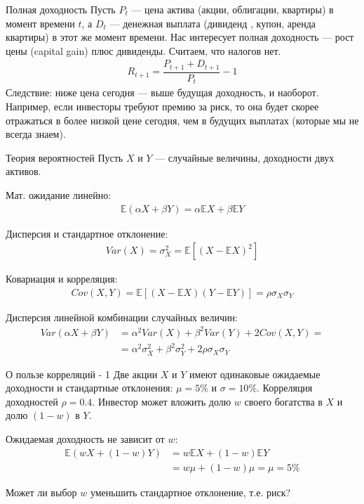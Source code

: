 \documentclass{beamer}
\begin{document}
\begin{frame}{Полная доходность}
\justify
Пусть $P_t$ --- цена актива (акции, облигации, квартиры) в момент времени $t$, а $D_t$ --- денежная выплата (дивиденд , купон, аренда квартиры) в этот же момент времени. Нас интересует полная доходность --- рост цены (capital gain) плюс дивиденды. Считаем, что налогов нет.
\begin{align*}
R_{t+1} = \dfrac{P_{t+1} + D_{t+1}}{P_t} - 1
\end{align*}
Следствие: ниже цена сегодня --- выше будущая доходность, и наоборот. Например, если инвесторы требуют премию за риск, то она будет скорее отражаться в более низкой цене сегодня, чем в будущих выплатах (которые мы не всегда знаем).
\end{frame}



\begin{frame}{Теория вероятностей}
\justify
Пусть $X$ и $Y$ --- случайные величины, доходности двух активов.

\vspace{\baselineskip}
Мат. ожидание линейно:
\begin{align*}
\mathbb{E}(\alpha X + \beta Y) = \alpha\mathbb{E}X + \beta\mathbb{E}Y
\end{align*}

Дисперсия и стандартное отклонение:
\begin{align*}
Var(X) = \sigma_{X}^2 = \mathbb{E}\left[(X - \mathbb{E}X)^2\right]
\end{align*}

Ковариация и корреляция:
\begin{align*}
Cov(X, Y) = \mathbb{E}\left[(X - \mathbb{E}X)(Y - \mathbb{E}Y)\right] = \rho\sigma_X\sigma_Y
\end{align*}


Дисперсия линейной комбинации случайных величин:
\begin{align*}
Var(\alpha X + \beta Y) &= \alpha^2 Var(X) + \beta^2 Var(Y) + 2Cov(X, Y) = \\
&= \alpha^2\sigma_X^2 + \beta^2 \sigma_Y^2 + 2\rho\sigma_X\sigma_Y
\end{align*}\end{frame}



\begin{frame}{О пользе корреляций - 1}
\justify
Две акции $X$ и $Y$ имеют одинаковые ожидаемые доходности и стандартные отклонения: $\mu = 5\%$ и $\sigma = 10\%$. Корреляция доходностей $\rho=0.4$. Инвестор может вложить долю $w$ своего богатства в $X$ и долю $(1 - w)$ в $Y$.

\vspace{\baselineskip}
Ожидаемая доходность не зависит от $w$:
\begin{align*}
\mathbb{E}(wX + (1 - w)Y) &= w\mathbb{E}X + (1-w)\mathbb{E}Y \\ &= w\mu + (1 - w)\mu = \mu = 5\%
\end{align*}

Может ли выбор $w$ уменьшить стандартное отклонение, т.е. риск?
\end{frame}
\end{document}

